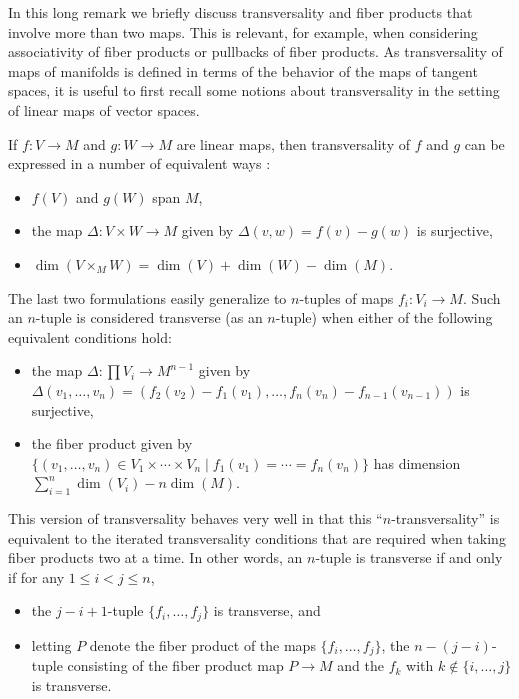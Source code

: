 \begin{remark}\label{R: multiproducts}
	In this long remark we briefly discuss transversality and fiber products that involve more than two maps.
	This is relevant, for example, when considering associativity of fiber products or pullbacks of fiber products.
	As transversality of maps of manifolds is defined in terms of the behavior of the maps of tangent spaces, it is useful to first recall some notions about transversality in the setting of linear maps of vector spaces.

	If $f \colon V\to M$ and $g \colon W\to M$ are linear maps, then transversality of $f$ and $g$ can be expressed in a number of equivalent ways \cite[Section 4.7]{RamBas09}:
	\begin{itemize}
		\item $f(V)$ and $g(W)$ span $M$,
		\item the map $\Delta \colon V\times W\to M$ given by $\Delta(v,w)=f(v)-g(w)$ is surjective,
		\item $\dim(V\times_MW)=\dim(V)+\dim(W)-\dim(M)$.
	\end{itemize}
	The last two formulations easily generalize to $n$-tuples of maps $f_i \colon V_i\to M$.
	Such an $n$-tuple is considered transverse (as an $n$-tuple) when either of the following equivalent conditions hold:
	\begin{itemize}
		\item the map $\Delta \colon \prod V_i\to M^{n-1}$ given by $\Delta(v_1,\ldots,v_n)=(f_2(v_2)-f_1(v_1),\ldots, f_n(v_n)-f_{n-1}(v_{n-1}))$ is surjective,
		\item the fiber product given by $\{(v_1,\ldots,v_n)\in V_1\times\cdots \times V_n\mid f_1(v_1)=\cdots=f_n(v_n)\}$ has dimension $\sum_{i=1}^n\dim(V_i) -n\dim(M)$.
	\end{itemize}
	This version of transversality behaves very well in that this ``$n$-transversality'' is equivalent to the iterated transversality conditions that are required when taking fiber products two at a time.
	In other words, an $n$-tuple is transverse if and only if for any $1\leq i<j\leq n$,
	\begin{itemize}
		\item the $j-i+1$-tuple $\{f_i,\ldots,f_j\}$ is transverse, and
		\item letting $P$ denote the fiber product of the maps $\{f_i,\ldots,f_j\}$, the $n-(j-i)$-tuple consisting of the fiber product map $P\to M$ and the $f_k$ with $k\notin\{i,\ldots,j\}$ is transverse.
	\end{itemize}

\end{remark}
